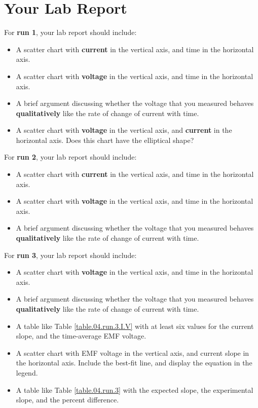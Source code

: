 \section{Your Lab Report}
For \textbf{run 1}, your lab report should include:
\begin{itemize}
	\item A scatter chart with \textbf{current} in the vertical axis, and time in the horizontal axis.
	\item A scatter chart with \textbf{voltage} in the vertical axis, and time in the horizontal axis.
	\item A brief argument discussing whether the voltage that you measured behaves \textbf{qualitatively} like the rate of change of current with time.
	\item A scatter chart with \textbf{voltage} in the vertical axis, and \textbf{current} in the horizontal axis. Does this chart have the elliptical shape?
\end{itemize}
For \textbf{run 2}, your lab report should include:
\begin{itemize}
	\item A scatter chart with \textbf{current} in the vertical axis, and time in the horizontal axis.
	\item A scatter chart with \textbf{voltage} in the vertical axis, and time in the horizontal axis.
	\item A brief argument discussing whether the voltage that you measured behaves \textbf{qualitatively} like the rate of change of current with time.
\end{itemize}
For \textbf{run 3}, your lab report should include:
\begin{itemize}
	\item A scatter chart with \textbf{voltage} in the vertical axis, and time in the horizontal axis.
	\item A brief argument discussing whether the voltage that you measured behaves \textbf{qualitatively} like the rate of change of current with time.
	\item A table like Table \ref{table.04.run.3.I.V} with at least six values for the current slope, and the time-average EMF voltage.
	\item A scatter chart with EMF voltage in the vertical axis, and current slope in the horizontal axis. Include the best-fit line, and display the equation in the legend.
	\item A table like Table \ref{table.04.run.3} with the expected slope, the experimental slope, and the percent difference.
\end{itemize}
